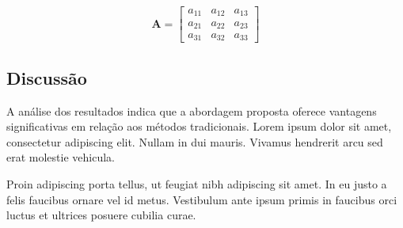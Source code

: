 \begin{equation}
\mathbf{A} = \begin{bmatrix}
a_{11} & a_{12} & a_{13} \\
a_{21} & a_{22} & a_{23} \\
a_{31} & a_{32} & a_{33}
\end{bmatrix}
\label{eq:matrix}
\end{equation}

\subsection{Discussão}

\lipsum[16-17] A análise dos resultados indica que a abordagem proposta oferece vantagens significativas em relação aos métodos tradicionais. Lorem ipsum dolor sit amet, consectetur adipiscing elit. Nullam in dui mauris. Vivamus hendrerit arcu sed erat molestie vehicula.

Proin adipiscing porta tellus, ut feugiat nibh adipiscing sit amet. In eu justo a felis faucibus ornare vel id metus. Vestibulum ante ipsum primis in faucibus orci luctus et ultrices posuere cubilia curae.

